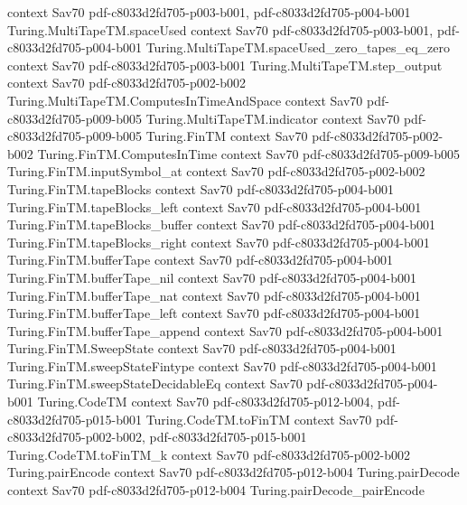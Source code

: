 \begin{theorem}
  {context}
  {Sav70}
  {pdf-c8033d2fd705-p003-b001,
    pdf-c8033d2fd705-p004-b001}
\proofstep
  {Turing.MultiTapeTM.spaceUsed}
  {context}
  {Sav70}
  {pdf-c8033d2fd705-p003-b001,
    pdf-c8033d2fd705-p004-b001}
\proofstep
  {Turing.MultiTapeTM.spaceUsed_zero_tapes_eq_zero}
  {context}
  {Sav70}
  {pdf-c8033d2fd705-p003-b001}
\proofstep
  {Turing.MultiTapeTM.step_output}
  {context}
  {Sav70}
  {pdf-c8033d2fd705-p002-b002}
\proofstep
  {Turing.MultiTapeTM.ComputesInTimeAndSpace}
  {context}
  {Sav70}
  {pdf-c8033d2fd705-p009-b005}
\proofstep
  {Turing.MultiTapeTM.indicator}
  {context}
  {Sav70}
  {pdf-c8033d2fd705-p009-b005}
\proofstep
  {Turing.FinTM}
  {context}
  {Sav70}
  {pdf-c8033d2fd705-p002-b002}
\proofstep
  {Turing.FinTM.ComputesInTime}
  {context}
  {Sav70}
  {pdf-c8033d2fd705-p009-b005}
\proofstep
  {Turing.FinTM.inputSymbol_at}
  {context}
  {Sav70}
  {pdf-c8033d2fd705-p002-b002}
\proofstep
  {Turing.FinTM.tapeBlocks}
  {context}
  {Sav70}
  {pdf-c8033d2fd705-p004-b001}
\proofstep
  {Turing.FinTM.tapeBlocks_left}
  {context}
  {Sav70}
  {pdf-c8033d2fd705-p004-b001}
\proofstep
  {Turing.FinTM.tapeBlocks_buffer}
  {context}
  {Sav70}
  {pdf-c8033d2fd705-p004-b001}
\proofstep
  {Turing.FinTM.tapeBlocks_right}
  {context}
  {Sav70}
  {pdf-c8033d2fd705-p004-b001}
\proofstep
  {Turing.FinTM.bufferTape}
  {context}
  {Sav70}
  {pdf-c8033d2fd705-p004-b001}
\proofstep
  {Turing.FinTM.bufferTape_nil}
  {context}
  {Sav70}
  {pdf-c8033d2fd705-p004-b001}
\proofstep
  {Turing.FinTM.bufferTape_nat}
  {context}
  {Sav70}
  {pdf-c8033d2fd705-p004-b001}
\proofstep
  {Turing.FinTM.bufferTape_left}
  {context}
  {Sav70}
  {pdf-c8033d2fd705-p004-b001}
\proofstep
  {Turing.FinTM.bufferTape_append}
  {context}
  {Sav70}
  {pdf-c8033d2fd705-p004-b001}
\proofstep
  {Turing.FinTM.SweepState}
  {context}
  {Sav70}
  {pdf-c8033d2fd705-p004-b001}
\proofstep
  {Turing.FinTM.sweepStateFintype}
  {context}
  {Sav70}
  {pdf-c8033d2fd705-p004-b001}
\proofstep
  {Turing.FinTM.sweepStateDecidableEq}
  {context}
  {Sav70}
  {pdf-c8033d2fd705-p004-b001}
\proofstep
  {Turing.CodeTM}
  {context}
  {Sav70}
  {pdf-c8033d2fd705-p012-b004,
    pdf-c8033d2fd705-p015-b001}
\proofstep
  {Turing.CodeTM.toFinTM}
  {context}
  {Sav70}
  {pdf-c8033d2fd705-p002-b002,
    pdf-c8033d2fd705-p015-b001}
\proofstep
  {Turing.CodeTM.toFinTM_k}
  {context}
  {Sav70}
  {pdf-c8033d2fd705-p002-b002}
\proofstep
  {Turing.pairEncode}
  {context}
  {Sav70}
  {pdf-c8033d2fd705-p012-b004}
\proofstep
  {Turing.pairDecode}
  {context}
  {Sav70}
  {pdf-c8033d2fd705-p012-b004}
\proofstep
  {Turing.pairDecode_pairEncode}

\end{theorem}
